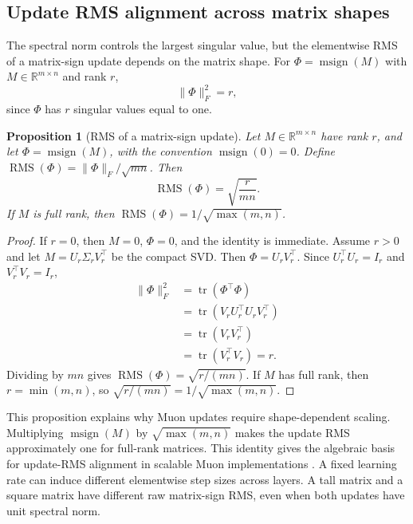 \documentclass[sigconf,nonacm]{acmart}
\newtheorem{proposition}{Proposition}
\begin{document}
\subsection{Update RMS alignment across matrix shapes}
The spectral norm controls the largest singular value, but the elementwise RMS of a matrix-sign update depends on the matrix shape. For $\Phi=\operatorname{msign}(M)$ with $M\in\mathbb{R}^{m\times n}$ and rank $r$,
\begin{equation}
  \|\Phi\|_F^2=r,
\end{equation}
since $\Phi$ has $r$ singular values equal to one.

\begin{proposition}[RMS of a matrix-sign update]\label{prop:rms}
Let $M\in\mathbb{R}^{m\times n}$ have rank $r$, and let $\Phi=\operatorname{msign}(M)$, with the convention $\operatorname{msign}(0)=0$. Define $\operatorname{RMS}(\Phi)=\|\Phi\|_F/\sqrt{mn}$. Then
\begin{equation}
  \operatorname{RMS}(\Phi)=\sqrt{\frac{r}{mn}}.
\end{equation}
If $M$ is full rank, then $\operatorname{RMS}(\Phi)=1/\sqrt{\max(m,n)}$.
\end{proposition}

\begin{proof}
If $r=0$, then $M=0$, $\Phi=0$, and the identity is immediate. Assume $r>0$ and let $M=U_r\Sigma_rV_r^\top$ be the compact SVD. Then $\Phi=U_rV_r^\top$. Since $U_r^\top U_r=I_r$ and $V_r^\top V_r=I_r$,
\begin{align}
\|\Phi\|_F^2
&=\operatorname{tr}(\Phi^\top\Phi)\\
&=\operatorname{tr}(V_rU_r^\top U_rV_r^\top)\\
&=\operatorname{tr}(V_rV_r^\top)\\
&=\operatorname{tr}(V_r^\top V_r)=r .
\end{align}
Dividing by $mn$ gives $\operatorname{RMS}(\Phi)=\sqrt{r/(mn)}$. If $M$ has full rank, then $r=\min(m,n)$, so $\sqrt{r/(mn)}=1/\sqrt{\max(m,n)}$.
\end{proof}

This proposition explains why Muon updates require shape-dependent scaling. Multiplying $\operatorname{msign}(M)$ by $\sqrt{\max(m,n)}$ makes the update RMS approximately one for full-rank matrices. This identity gives the algebraic basis for update-RMS alignment in scalable Muon implementations \citep{liu2025moonlight,su2025muonchoice}. A fixed learning rate can induce different elementwise step sizes across layers. A tall matrix and a square matrix have different raw matrix-sign RMS, even when both updates have unit spectral norm.
\end{document}
